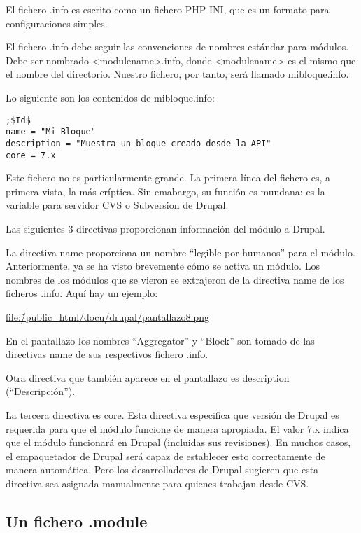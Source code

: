 \documentclass[11pt]{article}
\begin{document}
El fichero .info es escrito como un fichero PHP INI, que es un formato
para configuraciones simples.

El fichero .info debe seguir las convenciones de nombres estándar para
módulos. Debe ser nombrado <modulename>.info, donde <modulename> es el
mismo que el nombre del directorio. Nuestro fichero, por tanto, será
llamado mibloque.info.

Lo siguiente son los contenidos de mibloque.info:


\begin{verbatim}
;$Id$ 
name = "Mi Bloque" 
description = "Muestra un bloque creado desde la API" 
core = 7.x
\end{verbatim}



Este fichero no es particularmente grande. La primera línea del
fichero es, a primera vista, la más críptica. Sin emabargo, su función
es mundana: es la variable para servidor CVS o Subversion de Drupal.

Las siguientes 3 directivas proporcionan información del módulo a
Drupal.

La directiva name proporciona un nombre “legible por humanos” para el
módulo. Anteriormente, ya se ha visto brevemente cómo se activa un
módulo. Los nombres de los módulos que se vieron se extrajeron de la
directiva name de los ficheros .info. Aquí hay un ejemplo:

\href{file:///home/davidam/public_html/docu/drupal/pantallazo8.png}{file:\~/public\_html/docu/drupal/pantallazo8.png}  

En el pantallazo los nombres ``Aggregator'' y ``Block'' son tomado de las
directivas name de sus respectivos fichero .info.

Otra directiva que también aparece en el pantallazo es description
(``Descripción'').

La tercera directiva es core. Esta directiva especifica que versión de
Drupal es requerida para que el módulo funcione de manera
apropiada. El valor 7.x indica que el módulo funcionará en Drupal
(incluidas sus revisiones). En muchos casos, el empaquetador de Drupal
será capaz de establecer esto correctamente de manera automática. Pero
los desarrolladores de Drupal sugieren que esta directiva sea asignada
manualmente para quienes trabajan desde CVS.

\subsection{Un fichero .module}
\label{sec-2.6}
\end{document}
